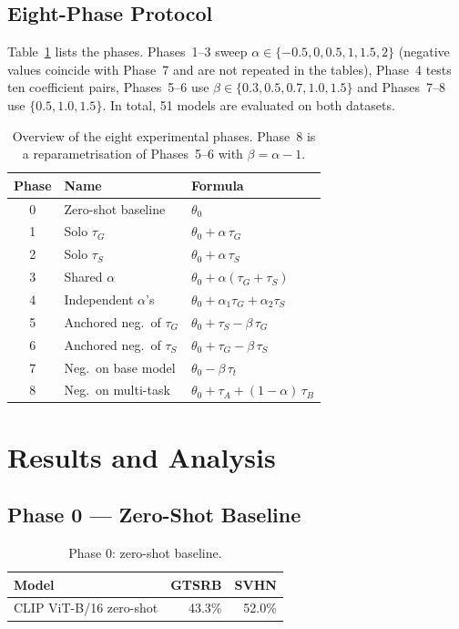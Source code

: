 \documentclass[11pt,a4paper,twocolumn]{article}
\newcommand{\tG}{\tau_G}
\newcommand{\tS}{\tau_S}
\begin{document}
\subsection{Eight-Phase Protocol}
Table~\ref{tab:protocol} lists the phases. Phases~1--3 sweep
$\alpha\in\{-0.5,0,0.5,1,1.5,2\}$ (negative values coincide with
Phase~7 and are not repeated in the tables), Phase~4 tests ten
coefficient pairs, Phases~5--6 use $\beta\in\{0.3,0.5,0.7,1.0,1.5\}$ and
Phases~7--8 use $\{0.5,1.0,1.5\}$. In total, 51 models are evaluated on
both datasets.

\begin{table}[t]
\centering\small
\begin{tabular}{@{}cll@{}}
\toprule
Phase & Name & Formula \\
\midrule
0 & Zero-shot baseline & $\theta_0$ \\
1 & Solo $\tG$ & $\theta_0+\alpha\,\tG$ \\
2 & Solo $\tS$ & $\theta_0+\alpha\,\tS$ \\
3 & Shared $\alpha$ & $\theta_0+\alpha(\tG+\tS)$ \\
4 & Independent $\alpha$'s & $\theta_0+\alpha_1\tG+\alpha_2\tS$ \\
5 & Anchored neg.\ of $\tG$ & $\theta_0+\tS-\beta\,\tG$ \\
6 & Anchored neg.\ of $\tS$ & $\theta_0+\tG-\beta\,\tS$ \\
7 & Neg.\ on base model & $\theta_0-\beta\,\tau_t$ \\
8 & Neg.\ on multi-task & $\theta_0+\tau_A+(1-\alpha)\,\tau_B$ \\
\bottomrule
\end{tabular}
\caption{Overview of the eight experimental phases. Phase~8 is a
reparametrisation of Phases~5--6 with $\beta=\alpha-1$.}
\label{tab:protocol}
\end{table}

\section{Results and Analysis}

\subsection{Phase 0 --- Zero-Shot Baseline}

\begin{table}[t]
\centering\small
\begin{tabular}{@{}lrr@{}}
\toprule
Model & GTSRB & SVHN \\
\midrule
CLIP ViT-B/16 zero-shot & 43.3\% & 52.0\% \\
\bottomrule
\end{tabular}
\caption{Phase 0: zero-shot baseline.}
\label{tab:phase0}
\end{table}
\end{document}
